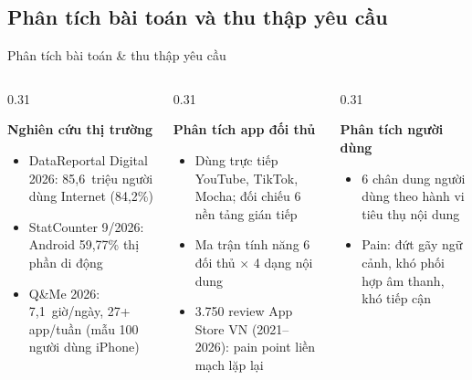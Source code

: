 \subsection{Phân tích bài toán và thu thập yêu cầu}
\begin{frame}{Phân tích bài toán \& thu thập yêu cầu}
\begin{columns}[T]
\begin{column}{0.31\textwidth}
\begin{block}{\scriptsize\bfseries Nghiên cứu thị trường}
{\tiny
\begin{itemize}\setlength{\itemsep}{1.5pt}
\item DataReportal Digital 2026: 85,6~triệu người dùng Internet (84,2\%)
\item StatCounter 9/2026: Android 59,77\% thị phần di động
\item Q\&Me 2026: 7,1~giờ/ngày, 27+ app/tuần (mẫu 100 người dùng iPhone)
\end{itemize}}
\end{block}
\end{column}
\begin{column}{0.31\textwidth}
\begin{block}{\scriptsize\bfseries Phân tích app đối thủ}
{\tiny
\begin{itemize}\setlength{\itemsep}{1.5pt}
\item Dùng trực tiếp YouTube, TikTok, Mocha; đối chiếu 6 nền tảng gián tiếp
\item Ma trận tính năng 6 đối thủ $\times$ 4 dạng nội dung
\item 3.750 review App Store VN (2021--2026): pain point liền mạch lặp lại
\end{itemize}}
\end{block}
\end{column}
\begin{column}{0.31\textwidth}
\begin{block}{\scriptsize\bfseries Phân tích người dùng}
{\tiny
\begin{itemize}\setlength{\itemsep}{1.5pt}
\item 6 chân dung người dùng theo hành vi tiêu thụ nội dung
\item Pain: đứt gãy ngữ cảnh, khó phối hợp âm thanh, khó tiếp cận
\end{itemize}}
\end{block}
\end{column}
\end{columns}
\vspace{1mm}

\end{frame}
